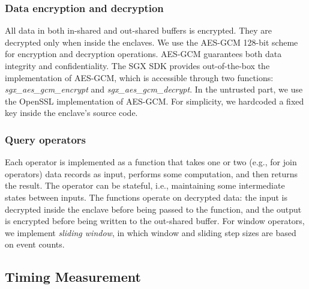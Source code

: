 \subsubsection*{Data encryption and decryption}
All data in both in-shared and out-shared buffers is encrypted. They are decrypted only when inside the enclaves. We use the AES-GCM 128-bit scheme for encryption and decryption operations. AES-GCM  guarantees both data integrity and confidentiality. The SGX SDK provides out-of-the-box the implementation of AES-GCM, which is accessible through two functions: \textit{sgx{\_}aes{\_}gcm{\_}encrypt} and
\textit{sgx{\_}aes{\_}gcm{\_}decrypt}. In the untrusted part, we use the OpenSSL \cite{openssl} implementation of AES-GCM. For simplicity, we hardcoded a fixed key inside the enclave's source code.


\subsubsection*{Query operators}
Each operator is implemented as a function that takes one or two (e.g., for join operators) data records as input, performs
some computation, and then returns the result. The operator can be stateful, i.e., maintaining some intermediate states
between inputs. The functions operate on decrypted data: the input is decrypted inside the enclave before being passed
to the function, and the output is encrypted before being written to the out-shared buffer.
{For window operators, we implement \textit{sliding window}, in which window and sliding step sizes are based on event counts.}


\subsection{Timing Measurement}

